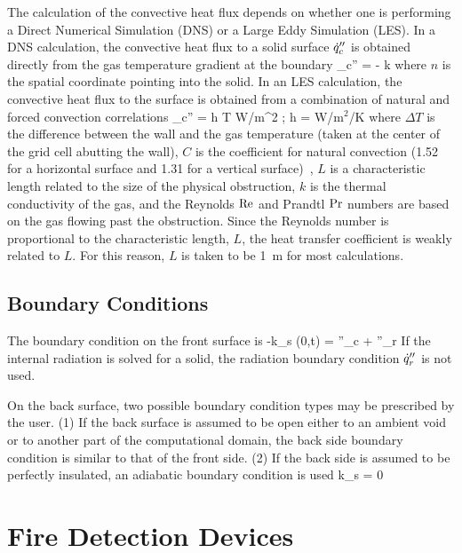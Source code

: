 \documentclass[11pt]{book}
\begin{document}
The calculation of the convective heat flux depends on whether one is
performing a Direct Numerical Simulation (DNS) or a
Large Eddy Simulation (LES).
In a DNS calculation, the convective heat flux to a solid surface $\dot{q}''_c$
is obtained directly from the gas temperature gradient at the boundary
\be \dq_c'' = - k \;  \ee
where $n$ is the spatial coordinate pointing into the solid.
In an LES calculation, the convective heat flux to the surface is
obtained from a combination of natural and forced
convection correlations
\be \dq_c'' = h \; \Delta T
    \quad \hbox{W/m}^2 \quad ; \quad h =
    \max \;   \quad
    \hbox{W/m$^2$/K} \ee
where $\Delta T$ is the difference between the wall and the gas temperature
(taken at the center of the grid cell abutting the wall),
$C$ is the coefficient for natural convection (1.52 for a horizontal surface
and 1.31 for a vertical surface)~\cite{Holman:1},
$L$ is a characteristic length related to the size of the physical
obstruction, $k$ is the thermal conductivity of the
gas, and the Reynolds $\hbox{Re}$ and Prandtl $\hbox{Pr}$ numbers are based on the
gas flowing
past the obstruction. Since the Reynolds number is proportional to the
characteristic length, $L$, the heat transfer coefficient is weakly
related to $L$. For this reason, $L$ is taken to be 1~m for most
calculations.


\subsection{Boundary Conditions}
\label{matbc}

The boundary condition on the front surface is
\be  -k_s (0,t) =  \dq''_c + \dq''_r \ee
If the internal radiation is solved for a solid, the radiation
boundary condition $\dot{q}''_r$ is not used.

On the back surface, two possible boundary condition types may be
prescribed by the user. (1) If the back surface is assumed to be open
either to an ambient
void or to another part of the computational domain,
the back side boundary condition is similar to that of
the front side. (2) If the back side is assumed to be perfectly insulated,
an adiabatic boundary condition is used
\be  k_s  =  0 \ee




\clearpage
\section{Fire Detection Devices}
\end{document}
